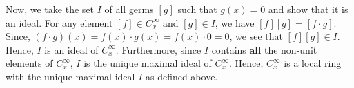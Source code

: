 \documentclass[12pt]{article}
\begin{document}
\begin{enumerate}
\begin{mybox}
    \vspace*{3mm}
    Now, we take the set $I$ of all germs $[g]$ such that
    $g(x)=0$ and show that it is an ideal.
    For any element $[f]\in C_x^\infty$
    and $[g]\in I$, we have $[f][g]=[f\cdot g]$. Since,
    $(f\cdot g)(x)=f(x)\cdot g(x)=f(x)\cdot 0=0$, we see
    that $[f][g]\in I$. Hence, $I$ is an ideal of
    $C_x^\infty$. Furthermore, since $I$ contains
    \textbf{all} the non-unit elements of $C_x^\infty$,
    $I$ is the unique maximal ideal of $C_x^{\infty}$.
    Hence, $C_x^{\infty}$ is a local ring with the unique
    maximal ideal $I$ as defined above.
    
\end{mybox}

\end{enumerate}
\end{document}
